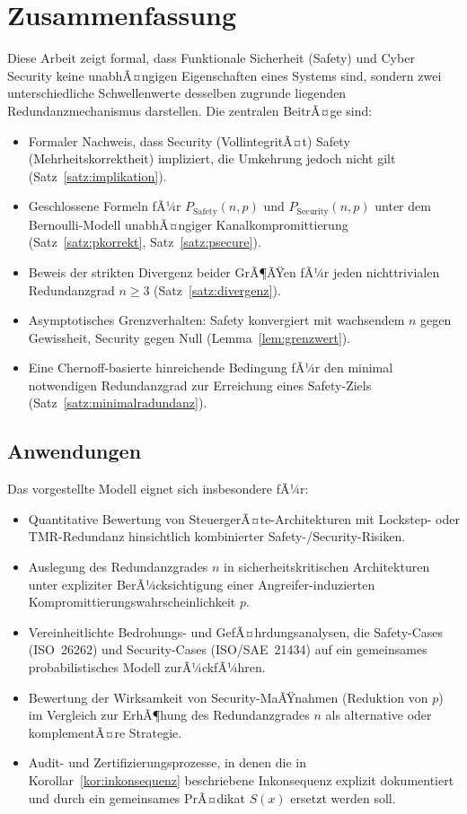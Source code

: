 ﻿\documentclass[a4paper,12pt]{article}
\theoremstyle{definition}
\begin{document}
\section{Zusammenfassung}

Diese Arbeit zeigt formal, dass Funktionale Sicherheit (Safety) und Cyber Security keine unabhÃ¤ngigen Eigenschaften eines Systems sind, sondern zwei unterschiedliche Schwellenwerte desselben zugrunde liegenden Redundanzmechanismus darstellen. Die zentralen BeitrÃ¤ge sind:

\begin{itemize}
	\item Formaler Nachweis, dass Security (VollintegritÃ¤t) Safety (Mehrheitskorrektheit) impliziert, die Umkehrung jedoch nicht gilt (Satz~\ref{satz:implikation}).
	\item Geschlossene Formeln fÃ¼r $P_{\mathrm{Safety}}(n,p)$ und $P_{\mathrm{Security}}(n,p)$ unter dem Bernoulli-Modell unabhÃ¤ngiger Kanalkompromittierung (Satz~\ref{satz:pkorrekt}, Satz~\ref{satz:psecure}).
	\item Beweis der strikten Divergenz beider GrÃ¶ÃŸen fÃ¼r jeden nichttrivialen Redundanzgrad $n \geq 3$ (Satz~\ref{satz:divergenz}).
	\item Asymptotisches Grenzverhalten: Safety konvergiert mit wachsendem $n$ gegen Gewissheit, Security gegen Null (Lemma~\ref{lem:grenzwert}).
	\item Eine Chernoff-basierte hinreichende Bedingung fÃ¼r den minimal notwendigen Redundanzgrad zur Erreichung eines Safety-Ziels (Satz~\ref{satz:minimalradundanz}).
\end{itemize}

\subsection{Anwendungen}

Das vorgestellte Modell eignet sich insbesondere fÃ¼r:
\begin{itemize}
	\item Quantitative Bewertung von SteuergerÃ¤te-Architekturen mit Lockstep- oder TMR-Redundanz hinsichtlich kombinierter Safety-/Security-Risiken.
	\item Auslegung des Redundanzgrades $n$ in sicherheitskritischen Architekturen unter expliziter BerÃ¼cksichtigung einer Angreifer-induzierten Kompromittierungswahrscheinlichkeit $p$.
	\item Vereinheitlichte Bedrohungs- und GefÃ¤hrdungsanalysen, die Safety-Cases (ISO~26262) und Security-Cases (ISO/SAE~21434) auf ein gemeinsames probabilistisches Modell zurÃ¼ckfÃ¼hren.
	\item Bewertung der Wirksamkeit von Security-MaÃŸnahmen (Reduktion von $p$) im Vergleich zur ErhÃ¶hung des Redundanzgrades $n$ als alternative oder komplementÃ¤re Strategie.
	\item Audit- und Zertifizierungsprozesse, in denen die in Korollar~\ref{kor:inkonsequenz} beschriebene Inkonsequenz explizit dokumentiert und durch ein gemeinsames PrÃ¤dikat $S(x)$ ersetzt werden soll.
\end{itemize}
\end{document}
